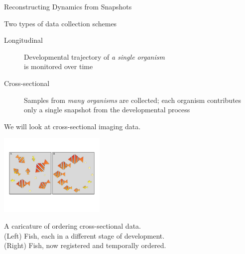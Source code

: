 \documentclass[12pt]{beamer}
\begin{document}
\begin{frame}{Reconstructing Dynamics from Snapshots}

Two types of data collection schemes%

\begin{description}
\item[Longitudinal] Developmental trajectory of {\em a single organism} \\is monitored over time
\item[Cross-sectional] Samples from {\em many organisms} are collected; each organism contributes only a single snapshot from the developmental process
\end{description}

\begin{center}
We will look at cross-sectional imaging data. %

\includegraphics[width=2in]{fig1}

{\scriptsize A caricature of ordering cross-sectional data. \\
(Left) Fish, each in a different stage of development.  \\(Right) Fish, now registered and temporally ordered. \par}
\end{center}

\end{frame}
\end{document}
